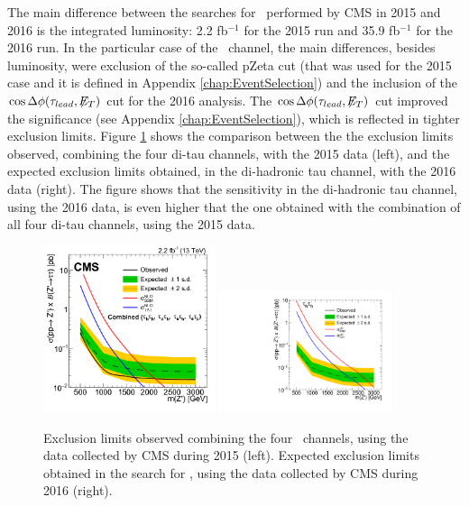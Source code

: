 \noindent The main difference between the searches for \Zprime~performed by 
CMS in 2015 and 2016 is the integrated luminosity: 2.2 fb$^{-1}$ for the 2015 run 
and 35.9 fb$^{-1}$ for the 2016 run. In the particular case of the \tauh\tauh~channel, the main differences, besides
luminosity, were exclusion of the so-called pZeta cut (that was used for the 2015 case
and it is defined in Appendix \ref{chap:EventSelection}) and the inclusion 
of the $\cos \Delta\phi(\tau_{lead},\not\!\!E_T)$ cut for the 2016 analysis. The 
$\cos \Delta\phi(\tau_{lead},\not\!\!E_T)$ cut improved the significance  (see Appendix \ref{chap:EventSelection}),
which is reflected in tighter exclusion limits. Figure \ref{fig:ComparisonCMS} shows the comparison between the 
the exclusion limits observed, combining the four di-tau channels, with the 2015 data
(left), and the expected exclusion limits obtained, in the di-hadronic tau channel, with the 2016 data (right). The figure 
shows that the sensitivity in the di-hadronic tau channel, using the 2016 data, is even higher 
that the one obtained with the combination of all four di-tau channels, using the 2015 data. 

\begin{figure}[ht]
 \begin{center}
 \captionsetup[subfloat]{farskip=0pt,captionskip=0.0cm,labelformat=empty}
  \includegraphics[clip,width=0.45\textwidth]{figuras/Chapter1/CMSZprimeditauRun2.png}
 \includegraphics[clip,width=0.45\textwidth]{figuras/Conclusions/tt_Limits.pdf}
 \end{center}
 \caption{Exclusion limits observed combining the four \Zprimetotautau~channels, using the data collected by CMS during 2015 (left).
 Expected exclusion limits obtained in the search for \Zprimetotauh, using the data collected by CMS during 2016 (right).}
 \label{fig:ComparisonCMS}
 \end{figure}

